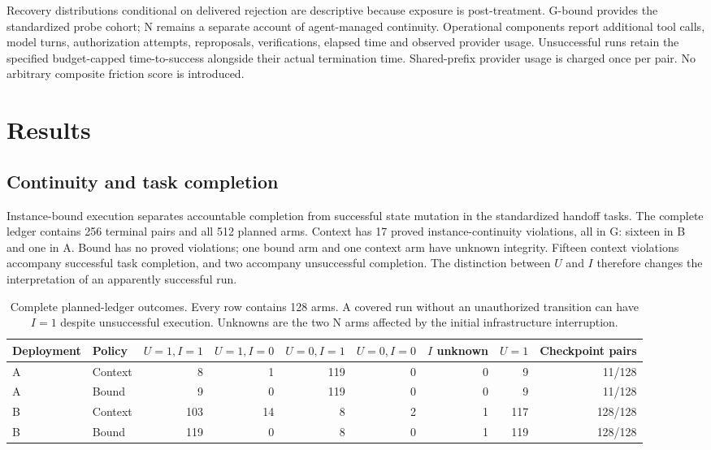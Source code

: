 \documentclass[10pt,a4paper,twocolumn]{article}
\begin{document}
Recovery distributions conditional on delivered rejection are descriptive because exposure is post-treatment. G-bound provides the standardized probe cohort; N remains a separate account of agent-managed continuity. Operational components report additional tool calls, model turns, authorization attempts, reproposals, verifications, elapsed time and observed provider usage. Unsuccessful runs retain the specified budget-capped time-to-success alongside their actual termination time. Shared-prefix provider usage is charged once per pair. No arbitrary composite friction score is introduced.

\section{Results}
\subsection{Continuity and task completion}
Instance-bound execution separates accountable completion from successful state mutation in the standardized handoff tasks. The complete ledger contains 256 terminal pairs and all 512 planned arms. Context has 17 proved instance-continuity violations, all in G: sixteen in B and one in A. Bound has no proved violations; one bound arm and one context arm have unknown integrity. Fifteen context violations accompany successful task completion, and two accompany unsuccessful completion. The distinction between $U$ and $I$ therefore changes the interpretation of an apparently successful run.

\begin{table}[t]
\centering\small
\caption{Complete planned-ledger outcomes. Every row contains 128 arms. A covered run without an unauthorized transition can have $I=1$ despite unsuccessful execution. Unknowns are the two N arms affected by the initial infrastructure interruption.}
\label{tab:joint}
\setlength{\tabcolsep}{4pt}
\begin{tabular}{@{}llrrrrrrr@{}}
\toprule
Deployment & Policy & $U=1,I=1$ & $U=1,I=0$ & $U=0,I=1$ & $U=0,I=0$ & $I$ unknown & $U=1$ & Checkpoint pairs \\
\midrule
A & Context & 8 & 1 & 119 & 0 & 0 & 9 & 11/128 \\
A & Bound & 9 & 0 & 119 & 0 & 0 & 9 & 11/128 \\
B & Context & 103 & 14 & 8 & 2 & 1 & 117 & 128/128 \\
B & Bound & 119 & 0 & 8 & 0 & 1 & 119 & 128/128 \\
\bottomrule
\end{tabular}
\end{table}
\end{document}

